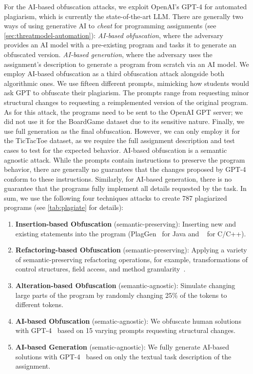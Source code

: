 For the AI-based obfuscation attacks, we exploit OpenAI's GPT-4 for automated plagiarism, which is currently the state-of-the-art LLM.
There are generally two ways of using generative AI to \textit{cheat} for programming assignments (see \autoref{sec:threatmodel-automation}):
\textit{AI-based obfuscation}, where the adversary provides an AI model with a pre-existing program and tasks it to generate an obfuscated version.
\textit{AI-based generation}, where the adversary uses the assignment's description to generate a program from scratch via an AI model.
%
We employ AI-based obfuscation as a third obfuscation attack alongside both algorithmic ones. We use fifteen different prompts, mimicking how students would ask GPT to obfuscate their plagiarism.
The prompts range from requesting minor structural changes to requesting a reimplemented version of the original program. As for this attack, the programs need to be sent to the OpenAI GPT server; we did not use it for the BoardGame dataset due to its sensitive nature.
Finally, we use full generation as the final obfuscation. However, we can only employ it for the TicTacToe dataset, as we require the full assignment description and test cases to test for the expected behavior.
AI-based obfuscation is a semantic agnostic attack. While the prompts contain instructions to preserve the program behavior, there are generally no guarantees that the changes proposed by GPT-4 conform to these instructions. 
Similarly, for AI-based generation, there is no guarantee that the programs fully implement all details requested by the task.
In sum, we use the following four techniques attacks to create 787 plagiarized programs (see \autoref{tab:plagiate} for details):
\begin{enumerate}[noitemsep]
 \item \textbf{Insertion-based Obfuscation} (semantic-preserving): Inserting new and existing statements into the program (PlagGen~\cite{Broedel2023} for Java and \mossad~\cite{DevoreMcDonald2020} for C/C++).
 \item \textbf{Refactoring-based Obfuscation} (semantic-preserving): Applying a variety of semantic-preserving refactoring operations, for example, transformations of control structures, field access, and method granularity~\cite{Maisch2024}.
 \item \textbf{Alteration-based Obfuscation} (semantic-agnostic): Simulate changing large parts of the program by randomly changing 25\% of the tokens to different tokens.
 \item \textbf{AI-based Obfuscation} (sematic-agnostic): We obfuscate human solutions with GPT-4~\cite{gpt4} based on 15 varying prompts requesting structural changes.
 \item \textbf{AI-based Generation} (sematic-agnostic): We fully generate AI-based solutions with GPT-4~\cite{gpt4} based on only the textual task description of the assignment.
\end{enumerate}
